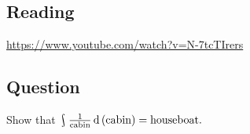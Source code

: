 


\subsection*{Reading}
\begin{center}
\begin{tcolorbox}[width=0.8\textwidth,colback={red},title={\textbf{Go and watch...}},colbacktitle=yellow,coltitle=blue]
  \textcolor{white}{\url{https://www.youtube.com/watch?v=N-7tcTIrers}}
\end{tcolorbox}
\end{center}

\subsection*{Question}
Show that $ \rint \frac{1}{\text{cabin}} \dif{\thinspace\text{(cabin)}} = \text{houseboat}. $



